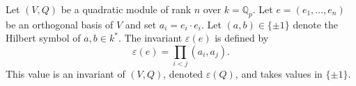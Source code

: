 Let $(V, Q)$ be a quadratic module of rank $n$ over $k = \mathbb{Q}_p$. Let $e = (e_1, \ldots, e_n)$ be an orthogonal basis of $V$ and set $a_i = e_i \cdot e_i$. Let $(a, b) \in \{\pm 1\}$ denote the Hilbert symbol of $a, b \in k^*$. The invariant $\varepsilon(e)$ is defined by
$$\varepsilon(e) = \prod_{i < j} (a_i, a_j).$$
This value is an invariant of $(V, Q)$, denoted $\varepsilon(Q)$, and takes values in $\{\pm 1\}$.
